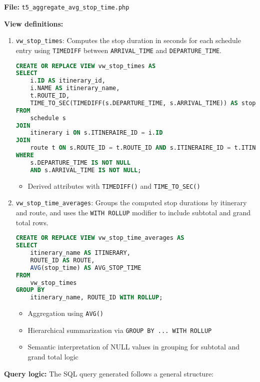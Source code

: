 \documentclass[a4paper, 12pt]{article}
\begin{document}
\textbf{File:} \texttt{t5\_aggregate\_avg\_stop\_time.php}

\textbf{View definitions:}
\begin{enumerate}
    \item \texttt{vw\_stop\_times}: Computes the stop duration in seconds for each schedule entry using \texttt{TIMEDIFF} between \texttt{ARRIVAL\_TIME} and \texttt{DEPARTURE\_TIME}.
    \begin{lstlisting}[language=SQL]
CREATE OR REPLACE VIEW vw_stop_times AS
SELECT 
    i.ID AS itinerary_id,
    i.NAME AS itinerary_name,
    t.ROUTE_ID,
    TIME_TO_SEC(TIMEDIFF(s.DEPARTURE_TIME, s.ARRIVAL_TIME)) AS stop_time
FROM 
    schedule s
JOIN 
    itinerary i ON s.ITINERAIRE_ID = i.ID
JOIN 
    route t ON s.ROUTE_ID = t.ROUTE_ID AND s.ITINERAIRE_ID = t.ITINERAIRE_ID
WHERE 
    s.DEPARTURE_TIME IS NOT NULL 
    AND s.ARRIVAL_TIME IS NOT NULL;
    \end{lstlisting}

    \begin{itemize}
        \item Derived attributes with \texttt{TIMEDIFF()} and \texttt{TIME\_TO\_SEC()}
    \end{itemize}


    \item \texttt{vw\_stop\_time\_averages}: Groups the computed stop durations by itinerary and route, and uses the \texttt{WITH ROLLUP} modifier to include subtotal and grand total rows.
    \begin{lstlisting}[language=SQL]
CREATE OR REPLACE VIEW vw_stop_time_averages AS
SELECT 
    itinerary_name AS ITINERARY,
    ROUTE_ID AS ROUTE,
    AVG(stop_time) AS AVG_STOP_TIME
FROM 
    vw_stop_times
GROUP BY 
    itinerary_name, ROUTE_ID WITH ROLLUP;
    \end{lstlisting}

    \begin{itemize}
        \item Aggregation using \texttt{AVG()}
        \item Hierarchical summarization via \texttt{GROUP BY ... WITH ROLLUP}
        \item Semantic interpretation of NULL values in grouping for subtotal and grand total logic
    \end{itemize}

\end{enumerate}

\textbf{Query logic:} The SQL query generated follows a general structure:
\end{document}
